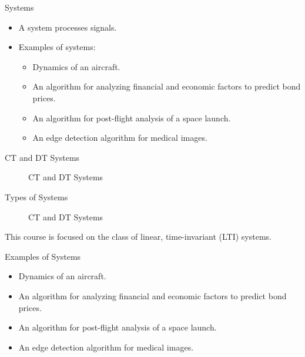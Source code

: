 \begin{frame}{Systems}
    \begin{itemize}[<+->]
        \item A system processes signals.
        \item Examples of systems:
            \begin{itemize}
                \item Dynamics of an aircraft.
                \item An algorithm for analyzing financial and economic factors to predict bond prices.
                \item An algorithm for post-flight analysis of a space launch.
                \item An edge detection algorithm for medical images.
            \end{itemize}
    \end{itemize}
\end{frame}

\begin{frame}[plain]{CT and DT Systems}
\begin{figure}
    \centering
        
        
    \caption{CT and DT Systems}\label{fi:ct_dt_systems}
\end{figure}
\end{frame}

\begin{frame}[plain]{Types of Systems}
    \begin{figure}
        \centering
        
        \caption{CT and DT Systems}\label{fi:system_types}
    \end{figure}
    This course is focused on the class of linear, time-invariant (LTI) systems.
\end{frame}


\begin{frame}{Examples of Systems}
    \begin{itemize}
      \item Dynamics of an aircraft.
      \item An algorithm for analyzing financial and economic factors to predict bond prices.
      \item An algorithm for post-flight analysis of a space launch.
      \item An edge detection algorithm for medical images.
    \end{itemize}
\end{frame}

